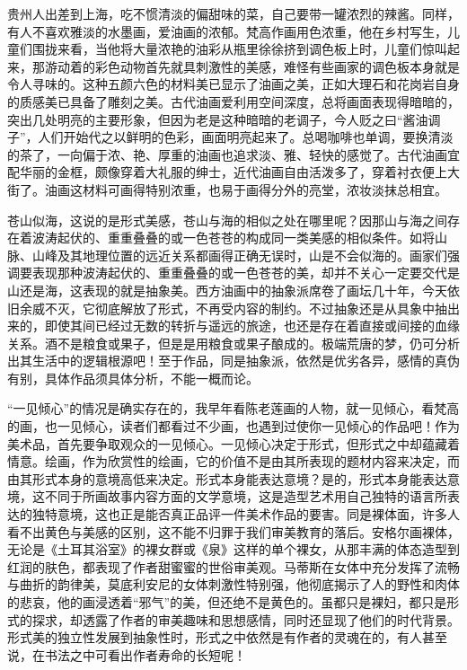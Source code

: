 \documentclass{article}
\begin{document}
贵州人出差到上海，吃不惯清淡的偏甜味的菜，自己要带一罐浓烈的辣酱。同样，有人不喜欢雅淡的水墨画，爱油画的浓郁。梵高作画用色浓重，他在乡村写生，儿童们围拢来看，当他将大量浓艳的油彩从瓶里徐徐挤到调色板上时，儿童们惊叫起来，那游动着的彩色动物首先就具刺激性的美感，难怪有些画家的调色板本身就是令人寻味的。这种五颜六色的材料美已显示了油画之美，正如大理石和花岗岩自身的质感美已具备了雕刻之美。古代油画爱利用空间深度，总将画面表现得暗暗的，突出几处明亮的主要形象，但因为老是这种暗暗的老调子，今人贬之曰“酱油调子”，人们开始代之以鲜明的色彩，画面明亮起来了。总喝咖啡也单调，要换清淡的茶了，一向偏于浓、艳、厚重的油画也追求淡、雅、轻快的感觉了。古代油画宜配华丽的金框，颇像穿着大礼服的绅士，近代油画自由活泼多了，穿着衬衣便上大街了。油画这材料可画得特别浓重，也易于画得分外的亮堂，浓妆淡抹总相宜。

苍山似海，这说的是形式美感，苍山与海的相似之处在哪里呢？因那山与海之间存在着波涛起伏的、重重叠叠的或一色苍苍的构成同一类美感的相似条件。如将山脉、山峰及其地理位置的远近关系都画得正确无误时，山是不会似海的。画家们强调要表现那种波涛起伏的、重重叠叠的或一色苍苍的美，却并不关心一定要交代是山还是海，这表现的就是抽象美。西方油画中的抽象派席卷了画坛几十年，今天依旧余威不灭，它彻底解放了形式，不再受内容的制约。不过抽象还是从具象中抽出来的，即使其间已经过无数的转折与遥远的旅途，也还是存在着直接或间接的血缘关系。酒不是粮食或果子，但是是用粮食或果子酿成的。极端荒唐的梦，仍可分析出其生活中的逻辑根源吧！至于作品，同是抽象派，依然是优劣各异，感情的真伪有别，具体作品须具体分析，不能一概而论。

“一见倾心”的情况是确实存在的，我早年看陈老莲画的人物，就一见倾心，看梵高的画，也一见倾心，读者们都看过不少画，也遇到过使你一见倾心的作品吧！作为美术品，首先要争取观众的一见倾心。一见倾心决定于形式，但形式之中却蕴藏着情意。绘画，作为欣赏性的绘画，它的价值不是由其所表现的题材内容来决定，而由其形式本身的意境高低来决定。形式本身能表达意境？是的，形式本身能表达意境，这不同于所画故事内容方面的文学意境，这是造型艺术用自己独特的语言所表达的独特意境，这也正是能否真正品评一件美术作品的要害。同是裸体面，许多人看不出黄色与美感的区别，这不能不归罪于我们审美教育的落后。安格尔画裸体，无论是《土耳其浴室》的裸女群或《泉》这样的单个裸女，从那丰满的体态造型到红润的肤色，都表现了作者甜蜜蜜的世俗审美观。马蒂斯在女体中充分发挥了流畅与曲折的韵律美，莫底利安尼的女体刺激性特别强，他彻底揭示了人的野性和肉体的悲哀，他的画浸透着“邪气”的美，但还绝不是黄色的。虽都只是裸妇，都只是形式的探求，却透露了作者的审美趣味和思想感情，同时还显现了他们的时代背景。形式美的独立性发展到抽象性时，形式之中依然是有作者的灵魂在的，有人甚至说，在书法之中可看出作者寿命的长短呢！
\end{document}
